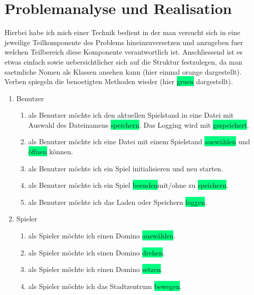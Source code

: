 \section{Problemanalyse und Realisation}
Hierbei habe ich mich einer Technik bedient in der man versucht sich in eine jeweilige Teilkomponente des Problems hineinzuversetzen und anzugeben fuer welchen Teilbereich diese Komponente verantwortlich ist. Anschliessend ist es etwas einfach sowie uebersichtlicher sich auf die Struktur festzulegen, da man saetmliche Nomen als Klassen ansehen kann (hier einmal \colorbox{Apricot}{orange} dargestellt). Verben spiegeln die benoetigten Methoden wieder (hier \colorbox{SpringGreen}{gruen} dargestellt).

\begin{enumerate}
	\item Benutzer
	\begin{enumerate}
		\item als \colorbox{Apricot}{Benutzer} möchte ich den aktuellen Spielstand in eine Datei mit Auswahl des Dateinamens \colorbox{SpringGreen}{speichern}. Das Logging wird mit \colorbox{SpringGreen}{gespeichert}.
		\item als \colorbox{Apricot}{Benutzer} möchte ich eine Datei mit einem Spielstand  \colorbox{SpringGreen}{auswählen} und \colorbox{SpringGreen}{öffnen} können.
		\item als \colorbox{Apricot}{Benutzer} möchte ich ein \colorbox{Apricot}{Spiel} initialisieren und neu starten.
		\item als \colorbox{Apricot}{Benutzer} möchte ich ein \colorbox{Apricot}{Spiel} \colorbox{SpringGreen}{beenden}mit/ohne zu \colorbox{SpringGreen}{speichern}.
		\item als \colorbox{Apricot}{Benutzer} möchte ich das Laden oder Speichern  \colorbox{SpringGreen}{loggen}.
	\end{enumerate}	
	\item Spieler
	\begin{enumerate}
		\item als \colorbox{Apricot}{Spieler} möchte ich einen \colorbox{Apricot}{Domino} \colorbox{SpringGreen}{auswählen}.
 		\item als \colorbox{Apricot}{Spieler} möchte ich einen \colorbox{Apricot}{Domino} \colorbox{SpringGreen}{drehen}.
		\item als \colorbox{Apricot}{Spieler} möchte ich einen \colorbox{Apricot}{Domino} \colorbox{SpringGreen}{setzen}.
		\item als \colorbox{Apricot}{Spieler} möchte ich das Stadtzentrum \colorbox{SpringGreen}{bewegen}.

\end{enumerate}
\end{enumerate}
